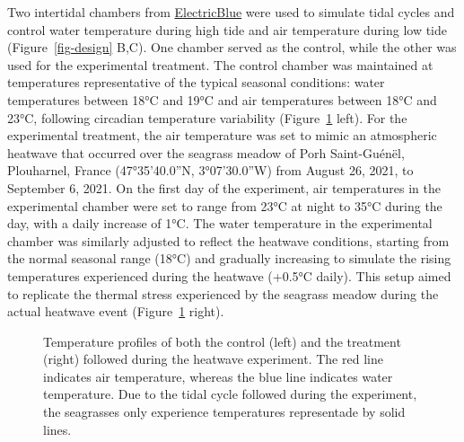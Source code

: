 \documentclass[
  number]{elsarticle}
\begin{document}
Two intertidal chambers from
\href{https://electricblue.eu/intertidal-chamber}{ElectricBlue} were
used to simulate tidal cycles and control water temperature during high
tide and air temperature during low tide (Figure~\ref{fig-design} B,C).
One chamber served as the control, while the other was used for the
experimental treatment. The control chamber was maintained at
temperatures representative of the typical seasonal conditions: water
temperatures between 18°C and 19°C and air temperatures between 18°C and
23°C, following circadian temperature variability
(Figure~\ref{fig-Profile} left). For the experimental treatment, the air
temperature was set to mimic an atmospheric heatwave that occurred over
the seagrass meadow of Porh Saint-Guénël, Plouharnel, France
(47°35'40.0''N, 3°07'30.0''W) from August 26, 2021, to September 6,
2021. On the first day of the experiment, air temperatures in the
experimental chamber were set to range from 23°C at night to 35°C during
the day, with a daily increase of 1°C. The water temperature in the
experimental chamber was similarly adjusted to reflect the heatwave
conditions, starting from the normal seasonal range (18°C) and gradually
increasing to simulate the rising temperatures experienced during the
heatwave (+0.5°C daily). This setup aimed to replicate the thermal
stress experienced by the seagrass meadow during the actual heatwave
event (Figure~\ref{fig-Profile} right).

\label{cell-fig-Profile}
\begin{figure}[H]


\caption{\label{fig-Profile}Temperature profiles of both the control
(left) and the treatment (right) followed during the heatwave
experiment. The red line indicates air temperature, whereas the blue
line indicates water temperature. Due to the tidal cycle followed during
the experiment, the seagrasses only experience temperatures representade
by solid lines.}

\end{figure}%
\end{document}
